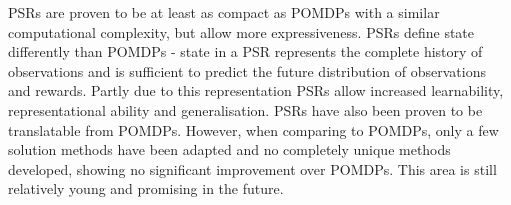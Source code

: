 PSRs are proven to be at least as compact as POMDPs with a similar
computational complexity, but allow more expressiveness. PSRs define state
differently than POMDPs - state in a PSR represents the complete history of
observations and is sufficient to predict the future distribution of
observations and rewards. Partly due to this representation PSRs allow
increased learnability, representational ability and generalisation. PSRs have
also been proven to be translatable from POMDPs. However, when comparing to
POMDPs, only a few solution methods have been adapted and no completely unique
methods developed, showing no significant improvement over POMDPs. This area is
still relatively young and promising in the future.
\parencite{Wingate2012ai+psr}
